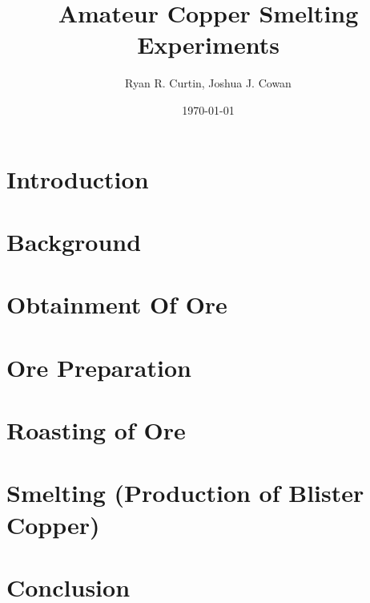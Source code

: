 \documentclass[letter,10pt]{article}
\title{Amateur Copper Smelting Experiments}
\author{Ryan R. Curtin, Joshua J. Cowan}
\date{\today}
\begin{document}
\maketitle

\begin{abstract}

\end{abstract}

\section{Introduction}



\section{Background}



\section{Obtainment Of Ore}



\section{Ore Preparation}



\section{Roasting of Ore}



\section{Smelting (Production of Blister Copper)}




\section{Conclusion}

\end{document}
